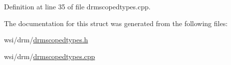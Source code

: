 Definition at line 35 of file drmscopedtypes.\+cpp.


\begin{DoxyCode}{0}
\end{DoxyCode}


The documentation for this struct was generated from the following files\+:\begin{DoxyCompactItemize}
\item 
wsi/drm/\mbox{\hyperlink{drmscopedtypes_8h}{drmscopedtypes.\+h}}\item 
wsi/drm/\mbox{\hyperlink{drmscopedtypes_8cpp}{drmscopedtypes.\+cpp}}\end{DoxyCompactItemize}
